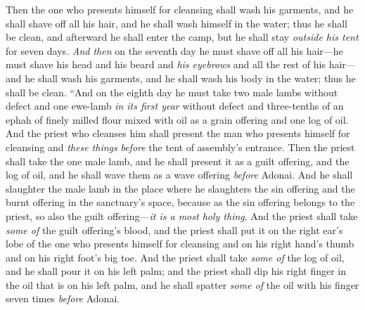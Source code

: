 \begin{biblechapter}
\verse Then the one who presents himself for cleansing shall wash his garments, and he shall shave off all his hair, and he shall wash himself in the water; thus he shall be clean, and afterward he shall enter the camp, but he shall stay \textit{outside his tent} for seven days.
\verse \textit{And then} on the seventh day he must shave off all his hair—he must shave his head and his beard and \textit{his eyebrows} and all the rest of his hair—and he shall wash his garments, and he shall wash his body in the water; thus he shall be clean.
\verse “And on the eighth day he must take two male lambs without defect and one ewe-lamb \textit{in its first year} without defect and three-tenths of an ephah of finely milled flour mixed with oil as a grain offering and one log of oil.
\verse And the priest who cleanses him shall present the man who presents himself for cleansing and \textit{these things} \textit{before} the tent of assembly’s entrance.
\verse Then the priest shall take the one male lamb, and he shall present it as a guilt offering, and the log of oil, and he shall wave them as a wave offering \textit{before} Adonai.
\verse And he shall slaughter the male lamb in the place where he slaughters the sin offering and the burnt offering in the sanctuary’s space, because as the sin offering belongs to the priest, so also the guilt offering—\textit{it is a most holy thing}.
\verse And the priest shall take \textit{some of} the guilt offering’s blood, and the priest shall put it on the right ear’s lobe of the one who presents himself for cleansing and on his right hand’s thumb and on his right foot’s big toe.
\verse And the priest shall take \textit{some of} the log of oil, and he shall pour it on his left palm;
\verse and the priest shall dip his right finger in the oil that is on his left palm, and he shall spatter \textit{some of} the oil with his finger seven times \textit{before} Adonai.

\end{biblechapter}
